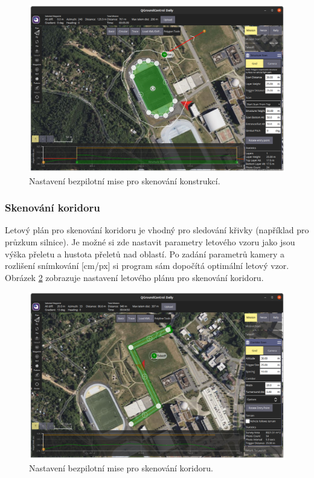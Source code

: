 \begin{figure}[!ht]
    \begin{center}
        \includegraphics[scale=0.34]{obrazky/QGC5}
    \end{center}
    \caption[Nastavení bezpilotní mise pro skenování konstrukcí]{Nastavení bezpilotní mise pro skenování konstrukcí.}
    \label{fig:QGC3}
\end{figure}

\subsubsection{Skenování koridoru}

Letový plán pro skenování koridoru je vhodný pro sledování křivky (například pro průzkum silnice). Je možné si zde nastavit parametry letového vzoru jako jsou výška přeletu a hustota přeletů nad oblastí. Po zadání parametrů kamery a rozlišení snímkování [cm/px] si program sám dopočítá optimální letový vzor. Obrázek \ref{fig:QGC4} zobrazuje nastavení letového plánu pro skenování koridoru.

\begin{figure}[!ht]
    \begin{center}
        \includegraphics[scale=0.34]{obrazky/QGC4}
    \end{center}
    \caption[Nastavení bezpilotní mise pro skenování koridoru]{Nastavení bezpilotní mise pro skenování koridoru.}
    \label{fig:QGC4}
\end{figure}

